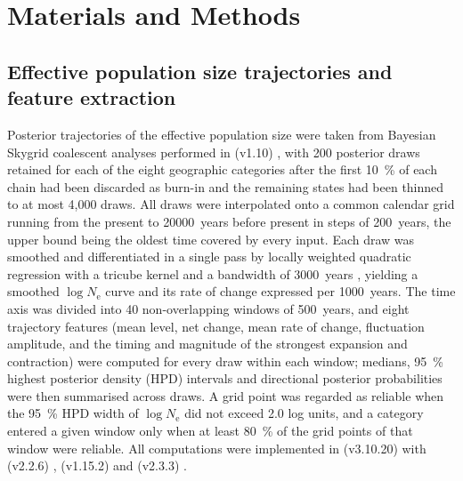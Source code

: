 \documentclass[12pt]{article}
\begin{document}
\MakeManuscriptTitle

\section{Materials and Methods}

\subsection{Effective population size trajectories and feature extraction}
Posterior trajectories of the effective population size were taken from
Bayesian Skygrid coalescent analyses \parencite{gill2013} performed in
 (v1.10) \parencite{suchard2018}, with 200 posterior draws
retained for each of the eight geographic categories after the first
\SI{10}{\percent} of each chain had been discarded as burn-in and the remaining
states had been thinned to at most 4{,}000 draws. All draws were interpolated
onto a common calendar grid running from the present to \SI{20000}{years} before
present in steps of \SI{200}{years}, the upper bound being the oldest time
covered by every input. Each draw was smoothed and differentiated in a single
pass by locally weighted quadratic regression with a tricube kernel and a
bandwidth of \SI{3000}{years} \parencite{cleveland1988}, yielding a smoothed
$\log N_\mathrm{e}$ curve and its rate of change expressed per \SI{1000}{years}.
The time axis was divided into 40 non-overlapping windows of \SI{500}{years},
and eight trajectory features (mean level, net change, mean rate of change,
fluctuation amplitude, and the timing and magnitude of the strongest expansion
and contraction) were computed for every draw within each window; medians,
\SI{95}{\percent} highest posterior density (HPD) intervals and directional
posterior probabilities were then summarised across draws. A grid point was
regarded as reliable when the \SI{95}{\percent} HPD width of $\log N_\mathrm{e}$
did not exceed 2.0 log units, and a category entered a given window only when at
least \SI{80}{\percent} of the grid points of that window were reliable. All
computations were implemented in  (v3.10.20) with
 (v2.2.6) \parencite{harris2020},  (v1.15.2)
\parencite{virtanen2020} and  (v2.3.3) \parencite{mckinney2010}.
\end{document}
